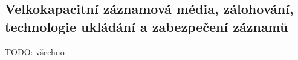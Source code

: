 \subsection{Velkokapacitní záznamová média, zálohování, technologie ukládání a zabezpečení záznamů}

TODO: všechno

